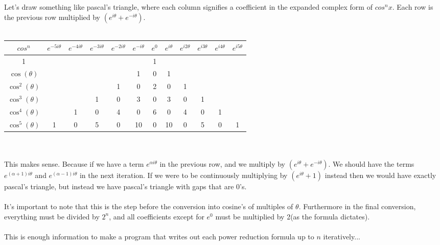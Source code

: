 \documentclass[12pt]{article}
\begin{document}
Let's draw something like pascal's triangle, where each column signifies a coefficient in the expanded complex form of $cos^nx$. 
Each row is the previous row multiplied by $(e^{i\theta} + e^{-i\theta})$.
\\
\\
\begin{tabular}{|c|c|c|c|c|c|c|c|c|c|c|c|}
\hline
$cos^n$ & $e^{-5i\theta}$ & $e^{-4i\theta}$ & $e^{-3i\theta}$ & $e^{-2i\theta}$ & $e^{-i\theta}$ & $e^0$ & $e^{i\theta}$ & $e^{i2\theta}$ & $e^{i3\theta}$ & $e^{i4\theta}$ & $e^{i5\theta}$
\\
\hline
1 &  &  &  &  &  & 1 &  &  &  &  & 
\\
\hline
$\cos(\theta)$ &  &  &  &  & 1 & 0 & 1 &  &  &  & 
\\
\hline
$\cos^2(\theta)$ &  &  &  & 1 & 0 & 2 & 0 & 1 &  &  & 
\\
\hline
$\cos^3(\theta)$ &  &  & 1 & 0 & 3 & 0 & 3 & 0 & 1 &  & 
\\
\hline
$\cos^4(\theta)$ &  & 1 & 0 & 4 & 0 & 6 & 0 & 4 & 0 & 1 & 
\\
\hline
$\cos^5(\theta)$ & 1 & 0 & 5 & 0 & 10 & 0 & 10 & 0 & 5 & 0 & 1
\\
\hline
\end{tabular}
\\
\\
This makes sense. Because if we have a term $e^{\alpha i\theta}$ in the previous row, and we multiply by $(e^{i\theta} + e^{-i\theta})$. We should have the terms $e^{(\alpha + 1) i\theta}$ and $e^{(\alpha - 1) i\theta}$ in the next iteration. If we were to be continuously multiplying by $(e^{i\theta} + 1)$ instead then we would have exactly pascal's triangle, but instead we have pascal's triangle with gaps that are 0's.
\\
\\
It's important to note that this is the step before the conversion into cosine's of multiples of $\theta$. Furthermore in the final conversion, everything must be divided by $2^n$, and all coefficients except for $e^0$ must be multiplied by 2(as the formula dictates).
\\
\\
This is enough information to make a program that writes out each power reduction formula up to $n$ iteratively...
\end{document}
